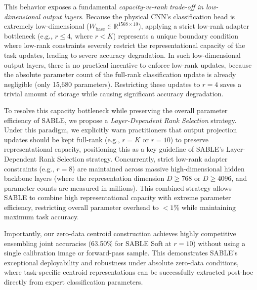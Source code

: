 This behavior exposes a fundamental \emph{capacity-vs-rank trade-off in low-dimensional output layers}. Because the physical CNN's classification head is extremely low-dimensional ($W_{\text{base}} \in \mathbb{R}^{1568 \times 10}$), applying a strict low-rank adapter bottleneck (e.g., $r \le 4$, where $r < K$) represents a unique boundary condition where low-rank constraints severely restrict the representational capacity of the task updates, leading to severe accuracy degradation. In such low-dimensional output layers, there is no practical incentive to enforce low-rank updates, because the absolute parameter count of the full-rank classification update is already negligible (only 15,680 parameters). Restricting these updates to $r=4$ saves a trivial amount of storage while causing significant accuracy degradation. 

To resolve this capacity bottleneck while preserving the overall parameter efficiency of SABLE, we propose a \emph{Layer-Dependent Rank Selection} strategy. Under this paradigm, we explicitly warn practitioners that output projection updates should be kept full-rank (e.g., $r = K$ or $r = 10$) to preserve representational capacity, positioning this as a key guideline of SABLE's Layer-Dependent Rank Selection strategy. Concurrently, strict low-rank adapter constraints (e.g., $r=8$) are maintained across massive high-dimensional hidden backbone layers (where the representation dimension $D \ge 768$ or $D \ge 4096$, and parameter counts are measured in millions). This combined strategy allows SABLE to combine high representational capacity with extreme parameter efficiency, restricting overall parameter overhead to $<1\%$ while maintaining maximum task accuracy. 

Importantly, our zero-data centroid construction achieves highly competitive ensembling joint accuracies (63.50\% for SABLE Soft at $r=10$) without using a single calibration image or forward-pass sample. This demonstrates SABLE's exceptional deployability and robustness under absolute zero-data conditions, where task-specific centroid representations can be successfully extracted post-hoc directly from expert classification parameters.

